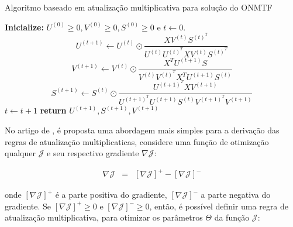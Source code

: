 \documentclass[
    12pt,                %
    oneside,            %
    a4paper,            %
    english,            %
    brazil                %
    ]{abntex2ppgsi}
\begin{document}
\begin{algorithm}
\caption{Algoritmo baseado em atualização multiplicativa para solução do ONMTF}
\label{algo:onmtf}
    \begin{algorithmic}[1]
            \State \textbf{Inicialize:} $U^{(0)} \geq 0, V^{(0)} \geq 0, S^{(0)} \geq 0$ e $t \gets 0$.
                \State
                    \begin{equation}
                    \label{eq:onmtf:updateU}
                        U^{(t+1)} \gets U^{(t)} \odot \frac{ X V^{(t)} S^{(t)^T} }{ U^{(t)} U^{(t)^T} X V^{(t)} S^{(t)^T} }
                    \end{equation}
                \State
                    \begin{equation}
                    \label{eq:onmtf:updateV}
                        V^{(t+1)} \gets V^{(t)} \odot \frac{ X^T U^{(t+1)} S }{ V^{(t)} V^{(t)^T} X^T U^{(t+1)} S^{(t)} }
                    \end{equation}
                \State
                    \begin{equation}
                    \label{eq:onmtf:updateS}
                        S^{(t+1)} \gets S^{(t)} \odot \frac{ U^{(t+1)^T} X V^{(t+1)} }{ U^{(t+1)^T} U^{(t+1)} S^{(t)} V^{(t+1)^T} V^{(t+1)} }
                    \end{equation}
                \State $t \gets t + 1$
            \EndWhile\label{euclidendwhile}
            \State \textbf{return} $U^{(t+1)}, S^{(t+1)}, V^{(t+1)}$
        \EndFunction
    \end{algorithmic}
\end{algorithm}

No artigo de , é proposta uma abordagem mais simples para a derivação das regras de atualização multiplicaticas, considere uma função de otimização qualquer $\mathcal{J}$ e seu respectivo gradiente $\nabla \mathcal{J}$:

\[
    \begin{array}{lclcl}
        \nabla \mathcal{J} & = & [\nabla \mathcal{J}]^+ - [\nabla \mathcal{J}]^-
    \end{array}
\]

onde $[\nabla \mathcal{J}]^+$ é a parte positiva do gradiente, $[\nabla \mathcal{J}]^-$ a parte negativa do gradiente.
Se $[\nabla \mathcal{J}]^+ \geq 0$ e $[\nabla \mathcal{J}]^- \geq 0$, então, é possível definir uma regra de atualização multiplicativa, para otimizar os parâmetros $\Theta$ da função $\mathcal{J}$:
\end{document}
